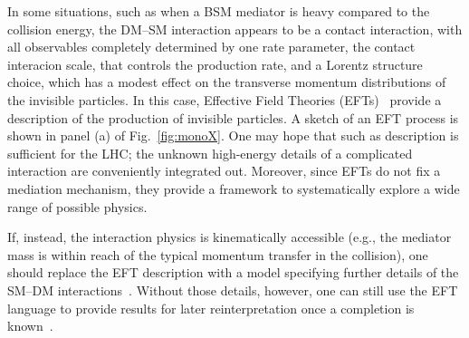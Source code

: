 
In some situations, such as when a BSM mediator is heavy compared to the collision energy, the DM--SM interaction appears to be a contact interaction, with all observables completely determined by one rate parameter, the contact interacion scale, that controls the production rate, and a Lorentz structure choice, which has a modest effect on the transverse momentum distributions of the invisible particles.
In this case, Effective Field Theories (EFTs)~\cite{Goodman:2010ku,Bai:2010hh,Fox:2011pm} provide a description of the production of invisible particles.
A sketch of an EFT process is shown in panel (a) of Fig.~\ref{fig:monoX}.
One may hope that such as description is sufficient for the LHC; the unknown high-energy details of a complicated interaction are conveniently integrated out.
Moreover, since EFTs do not fix a mediation mechanism, they provide a framework to systematically explore a wide range of possible physics.


If, instead, the interaction physics is kinematically accessible (e.g., the mediator mass is within reach of the typical momentum transfer in the collision), one should replace the EFT description with a model specifying further details of the SM--DM interactions~\cite{Shoemaker:2011vi}.
Without those details, however, one can still use the EFT language to provide results for later reinterpretation once a completion is known~\cite{Racco:2015dxa,Busoni:2013lha}. 


